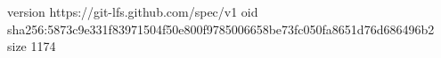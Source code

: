version https://git-lfs.github.com/spec/v1
oid sha256:5873c9e331f83971504f50e800f9785006658be73fc050fa8651d76d686496b2
size 1174

